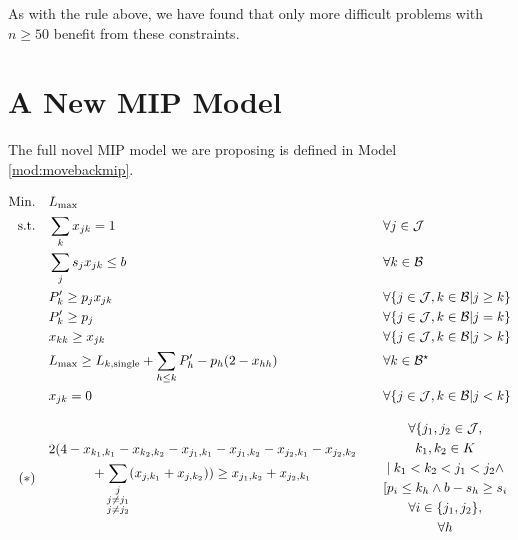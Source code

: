 \documentclass[oribibl]{llncs}
\def\Lmax{{L_{\mathrm{max}}}}
\begin{document}
As with the rule above, we have found that only more difficult problems with $n
\geq 50$ benefit from these constraints.

\section{A New MIP Model}
\label{sec:newMIPmodel}

The full novel MIP model we are proposing is defined in Model \ref{mod:movebackmip}.

\begin{model}
\begin{alignat}{2}
\mathrm{Min.}\quad & \Lmax && \\
\mathrm{s.t.}\quad & \label{mbm:eq7}\sum_{k} x_{jk} = 1 \quad && \forall j \in \mathcal{J} \\
& \label{mbm:eq6}\sum_{j} s_j x_{jk} \leq b \quad && \forall k \in \mathcal{B} \\
&\label{mbm:eq3} P'_k \geq p_j x_{jk} \quad && \forall \{j \in \mathcal{J}, k \in \mathcal{B} | j \geq k\} \\
&\label{mbm:eq10} P'_k \geq p_j \quad && \forall \{j \in \mathcal{J}, k \in \mathcal{B} | j = k\} \\
&\label{mbm:eq5} x_{kk} \geq x_{jk} \quad && \forall \{j \in \mathcal{J}, k \in \mathcal{B} | j > k\} \\
&\label{mbm:eq4} \Lmax \geq L_{k,\mathrm{single}} + \sum_{h\leq k} P'_h - p_h(2 -
x_{hh}) \quad && \forall k \in \mathcal{B}^\star \\
  \label{mbm:eq1} & x_{jk} = 0 \quad && \forall \{j \in \mathcal{J}, k \in \mathcal{B} | j < k\}
  \\[2ex]
  (*)\quad \label{mbm:eq8} & \begin{gathered} 2 (  4 - x_{k_1,k_1} - x_{k_2,k_2} - x_{j_1,k_1} - x_{j_1,k_2} -
x_{j_2,k_1} - x_{j_2,k_2}\hfill \\+ \sum_{\substack{{j}\\{j \neq j_1}\\{j \neq
j_2}}} (x_{j,k_1} + x_{j,k_2}) ) \geq x_{j_1,k_2} + x_{j_2,k_1} \end{gathered}
\quad && \begin{gathered} \forall\{ j_1, j_2 \in \mathcal{J}, \\ k_1, k_2 \in K \\|\; k_1 < k_2 <
j_1 < j_2 \land \\ [p_i \leq k_h \land b - s_h \geq s_i\\ \forall i \in
\{j_1,j_2\}, \\ \forall h

\end{gathered}
\end{alignat}
\end{model}
\end{document}
